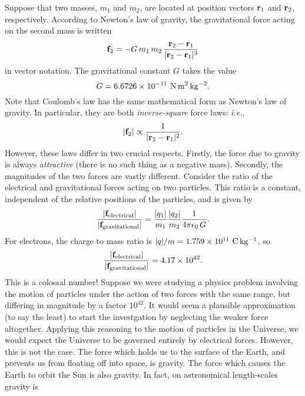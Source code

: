 Suppose that two masses, $m_1$ and $m_2$, are located at position vectors
${\bf r}_1$ and ${\bf r}_2$, respectively. According to Newton's law
of gravity, the gravitational force acting on the second mass
is written
\begin{equation}\label{e33}
{\bf f}_2 = - G \,m_1 \,m_2\, \frac{{\bf r}_2 - {\bf r}_1}
{|{\bf r}_2 - {\bf r}_1|^{3}}
\end{equation}
in vector notation. The gravitational constant $G$ takes the value
\begin{equation}
G = 6.6726\times 10^{-11}\,\,{\rm N \,m^2 \,kg^{-2}}.
\end{equation}
Note that Coulomb's law has the same mathematical form as Newton's law of gravity.
In particular, they  are both {\em inverse-square} force laws: {\em i.e.},
\begin{equation}
|{\bf f}_2| \propto \frac{1}{|{\bf r}_2- {\bf r}_1|^2}.
\end{equation}
However, these laws differ in two crucial respects. Firstly, the force due to gravity
is always {\em attractive} (there is no such thing as a negative mass). 
Secondly, the magnitudes of the two forces are vastly different. 
Consider the ratio of the electrical and gravitational forces acting on two
particles. This ratio is a constant, independent of the relative positions
of the particles, and is given by
\begin{equation}
\frac{|{\bf f}_{\rm electrical}|}{|{\bf f}_{\rm gravitational}|}
= \frac{|q_1|}{m_1}\frac{|q_2|}{m_2} \frac{1}{4\pi\epsilon_0 \,G}.
\end{equation}
For electrons, the charge to mass ratio is $|q|/m = 1.759\times 10^{11}~{\rm C\, kg^{-1}}$,
so
\begin{equation}
\frac{|{\bf f}_{\rm electrical}|}{|{\bf f}_{\rm gravitational}|}
= 4.17\times 10^{42}.
\end{equation}
This is a colossal number! Suppose we were studying a physics problem involving the motion
of particles  under the action of two forces with the
same range, but differing in magnitude by a factor
$10^{42}$. It would seem a plausible approximation (to say the least) to
start the investgation by neglecting the weaker force altogether. Applying this reasoning to the motion of
particles in the Universe, we would expect the Universe to be governed entirely by 
electrical forces. However, this is not the case. The force which
holds us to the surface of the Earth, and  prevents us  from
floating off into space, is gravity. The force which causes the Earth
to orbit the Sun is also gravity. In fact, on astronomical length-scales gravity is 
